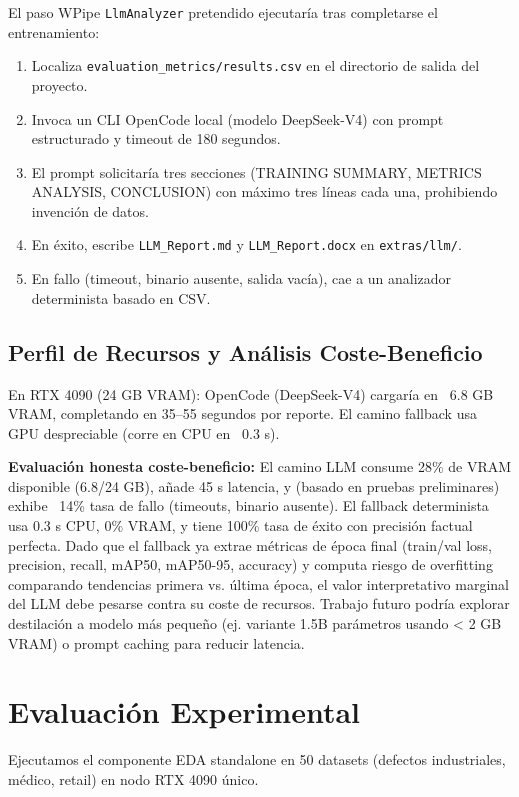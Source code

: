 \documentclass[10pt,twocolumn,letterpaper]{article}
\begin{document}
El paso WPipe \texttt{LlmAnalyzer} pretendido ejecutaría tras completarse el entrenamiento:
\begin{enumerate}
    \item Localiza \texttt{evaluation\_metrics/results.csv} en el directorio de salida del proyecto.
    \item Invoca un CLI OpenCode local (modelo DeepSeek-V4) con prompt estructurado y timeout de 180 segundos.
    \item El prompt solicitaría tres secciones (TRAINING SUMMARY, METRICS ANALYSIS, CONCLUSION) con máximo tres líneas cada una, prohibiendo invención de datos.
    \item En éxito, escribe \texttt{LLM\_Report.md} y \texttt{LLM\_Report.docx} en \texttt{extras/llm/}.
    \item En fallo (timeout, binario ausente, salida vacía), cae a un analizador determinista basado en CSV.
\end{enumerate}

\subsection{Perfil de Recursos y Análisis Coste-Beneficio}
En RTX 4090 (24 GB VRAM): OpenCode (DeepSeek-V4) cargaría en ~6.8 GB VRAM, completando en 35--55 segundos por reporte. El camino fallback usa GPU despreciable (corre en CPU en ~0.3 s).

\textbf{Evaluación honesta coste-beneficio:} El camino LLM consume 28\% de VRAM disponible (6.8/24 GB), añade 45 s latencia, y (basado en pruebas preliminares) exhibe ~14\% tasa de fallo (timeouts, binario ausente). El fallback determinista usa 0.3 s CPU, 0\% VRAM, y tiene 100\% tasa de éxito con precisión factual perfecta. Dado que el fallback ya extrae métricas de época final (train/val loss, precision, recall, mAP50, mAP50-95, accuracy) y computa riesgo de overfitting comparando tendencias primera vs. última época, el valor interpretativo marginal del LLM debe pesarse contra su coste de recursos. Trabajo futuro podría explorar destilación a modelo más pequeño (ej. variante 1.5B parámetros usando < 2 GB VRAM) o prompt caching para reducir latencia.

\section{Evaluación Experimental}
Ejecutamos el componente EDA standalone en 50 datasets (defectos industriales, médico, retail) en nodo RTX 4090 único.
\end{document}
